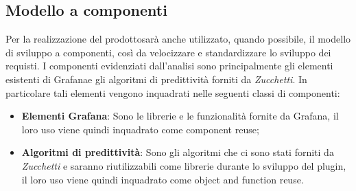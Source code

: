 \subsection{Modello a componenti}
Per la realizzazione del prodotto\glosp sarà anche utilizzato, quando possibile, il modello di sviluppo a componenti, così da velocizzare e standardizzare lo sviluppo dei requisti.
I componenti evidenziati dall'analisi sono principalmente gli elementi esistenti di Grafana\glosp e gli algoritmi di predittività forniti da \textit{Zucchetti}.
In particolare tali elementi vengono inquadrati nelle seguenti classi di componenti:
\begin{itemize}
	\item \textbf{Elementi Grafana}\glo: Sono le librerie  e le funzionalità fornite da Grafana\glo, il loro uso viene quindi inquadrato come component reuse;
	\item \textbf{Algoritmi di predittività}: Sono gli algoritmi che ci sono stati forniti da \textit{Zucchetti} e saranno riutilizzabili come librerie durante lo sviluppo del plugin, il loro uso viene quindi inquadrato come object and function reuse.
\end{itemize}
